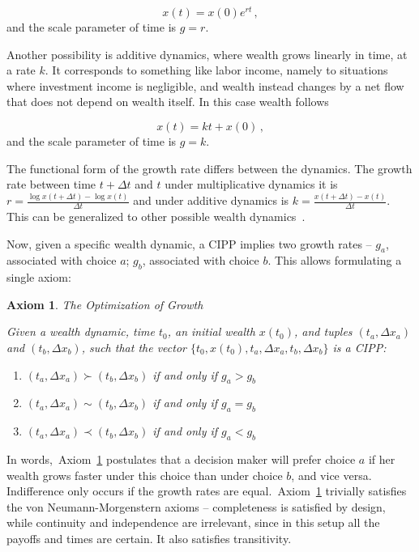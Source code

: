 \documentclass[11pt]{article}
\newtheorem{axiom}{Axiom}
\newcommand{\Aref}[1]{Axiom~\ref{ax:#1}}
\newcommand{\be}{\begin{equation}}
\newcommand{\ee}{\end{equation}}
\newcommand{\Dt}{\Delta t}
\newcommand{\Dx}{\Delta x}
\numberwithin{equation}{section}
\begin{document}
\be
x\left(t\right) = x\left(0\right) e^{r t}\,,
\ee
and the scale parameter of time is $g=r$.

Another possibility is additive dynamics, where wealth grows linearly in time, at a rate $k$. It corresponds to something like labor income, namely to situations where investment income is negligible, and wealth instead changes by a net flow that does not depend on wealth itself. In this case wealth follows

\be
x\left(t\right) = k t + x\left(0\right)\,,
\ee
and the scale parameter of time is $g=k$.

The functional form of the growth rate differs between the dynamics. The growth rate between time $t+\Dt$ and $t$ under multiplicative dynamics it is $r = \frac{\log x(t+\Dt)-\log x(t)}{\Dt}$ and under additive dynamics is $k = \frac{x\left(t+\Dt\right)-x\left(t\right)}{\Dt}$. This can be generalized to other possible wealth dynamics~\citep{peters2016evaluating,peters2018time}.

Now, given a specific wealth dynamic, a CIPP implies two growth rates -- $g_a$, associated with choice $a$; $g_b$, associated with choice $b$. This allows formulating a single axiom:

\begin{axiom}{The Optimization of Growth}

Given a wealth dynamic, time $t_0$, an initial wealth $x\left(t_0\right)$, and tuples $\left(t_a,\Dx_a\right)$ and $\left(t_b,\Dx_b\right)$, such that the vector $\{t_0,x\left(t_0\right),t_a,\Dx_a,t_b,\Dx_b\}$ is a CIPP:

\begin{enumerate}
\item $\left(t_a,\Dx_a\right) \succ \left(t_b,\Dx_b\right)$ if and only if $g_a > g_b$
\item $\left(t_a,\Dx_a\right) \sim \left(t_b,\Dx_b\right)$ if and only if $g_a = g_b$
\item $\left(t_a,\Dx_a\right) \prec \left(t_b,\Dx_b\right)$ if and only if $g_a < g_b$
\end{enumerate}
\label{ax:ax1}
\end{axiom}

In words,~\Aref{ax1} postulates that a decision maker will prefer choice $a$ if her wealth grows faster under this choice than under choice $b$, and vice versa. Indifference only occurs if the growth rates are equal.~\Aref{ax1} trivially satisfies the von Neumann-Morgenstern axioms -- completeness is satisfied by design, while continuity and independence are irrelevant, since in this setup all the payoffs and times are certain. It also satisfies transitivity.
\end{document}
